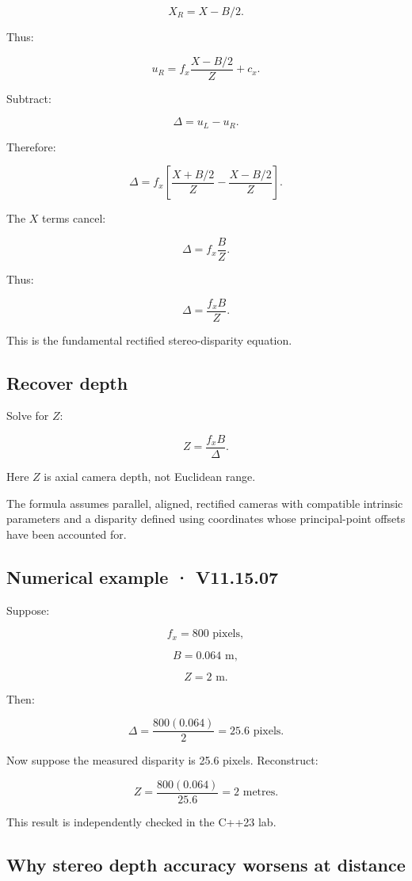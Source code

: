 \[ X_R=X-B/2. \]

Thus:

\[ \boxed{ u_R=f_x\frac{X-B/2}{Z}+c_x. } \]

Subtract:

\[ \Delta=u_L-u_R. \]

Therefore:

\[ \Delta = f_x \left[ \frac{X+B/2}{Z} - \frac{X-B/2}{Z} \right]. \]

The \(X\) terms cancel:

\[ \Delta=f_x\frac BZ. \]

Thus:

\[ \boxed{ \Delta=\frac{f_xB}{Z}. } \]

This is the fundamental rectified stereo-disparity equation.

\subsection{Recover depth}\label{02-foundations-ii-ch035-recover-depth}

Solve for \(Z\):

\[ \boxed{ Z=\frac{f_xB}{\Delta}. } \]

Here \(Z\) is axial camera depth, not Euclidean range.

The formula assumes parallel, aligned, rectified cameras with compatible intrinsic parameters and a disparity defined using coordinates whose principal-point offsets have been accounted for.

\subsection{Numerical example · V11.15.07}\label{02-foundations-ii-ch035-numerical-example-v11.15.07}

Suppose:

\[ f_x=800\text{ pixels}, \]

\[ B=0.064\text{ m}, \]

\[ Z=2\text{ m}. \]

Then:

\[ \Delta=\frac{800(0.064)}2 =\boxed{25.6\text{ pixels}}. \]

Now suppose the measured disparity is 25.6 pixels. Reconstruct:

\[ Z=\frac{800(0.064)}{25.6} =\boxed{2\text{ metres}}. \]

This result is independently checked in the C++23 lab.

\subsection{Why stereo depth accuracy worsens at distance}\label{02-foundations-ii-ch035-why-stereo-depth-accuracy-worsens-at-distance}

